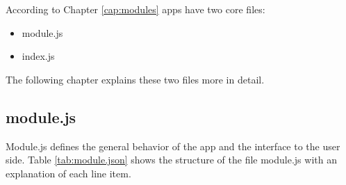 According to Chapter \ref{cap:modules} apps have two core files:

\begin{itemize}
\item module.js
\item index.js
\end{itemize}

The following chapter explains these two files more in detail. 

\subsection{module.js}

Module.js defines the general behavior of the app and the interface to the user side.
Table \ref{tab:module.json} 
shows the structure of the file module.js with an explanation of each line item.

